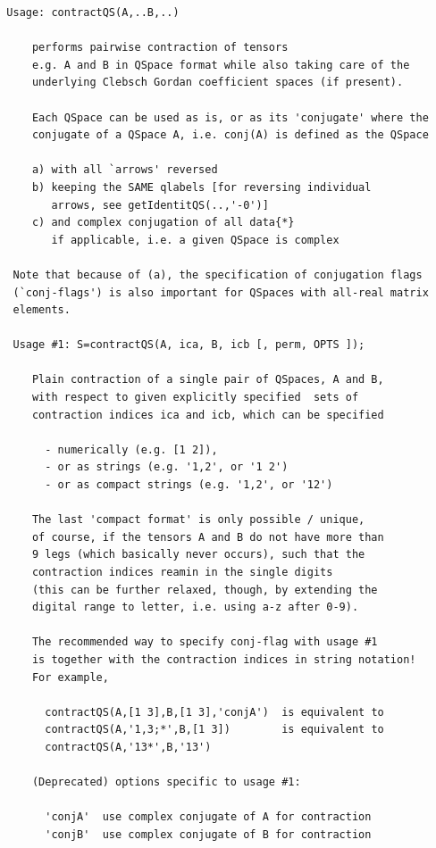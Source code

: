\documentclass[twoside,12pt]{article}
\begin{document}
\pagebreak[3]



\begin{verbatim}
  Usage: contractQS(A,..B,..)
 
      performs pairwise contraction of tensors
      e.g. A and B in QSpace format while also taking care of the
      underlying Clebsch Gordan coefficient spaces (if present).
 
      Each QSpace can be used as is, or as its 'conjugate' where the
      conjugate of a QSpace A, i.e. conj(A) is defined as the QSpace
 
      a) with all `arrows' reversed
      b) keeping the SAME qlabels [for reversing individual
         arrows, see getIdentitQS(..,'-0')]
      c) and complex conjugation of all data{*}
         if applicable, i.e. a given QSpace is complex
 
   Note that because of (a), the specification of conjugation flags
   (`conj-flags') is also important for QSpaces with all-real matrix
   elements.
 
   Usage #1: S=contractQS(A, ica, B, icb [, perm, OPTS ]);
 
      Plain contraction of a single pair of QSpaces, A and B,
      with respect to given explicitly specified  sets of
      contraction indices ica and icb, which can be specified
 
        - numerically (e.g. [1 2]),
        - or as strings (e.g. '1,2', or '1 2')
        - or as compact strings (e.g. '1,2', or '12')
 
      The last 'compact format' is only possible / unique,
      of course, if the tensors A and B do not have more than
      9 legs (which basically never occurs), such that the
      contraction indices reamin in the single digits
      (this can be further relaxed, though, by extending the
      digital range to letter, i.e. using a-z after 0-9).
 
      The recommended way to specify conj-flag with usage #1
      is together with the contraction indices in string notation!
      For example,
 
        contractQS(A,[1 3],B,[1 3],'conjA')  is equivalent to
        contractQS(A,'1,3;*',B,[1 3])        is equivalent to
        contractQS(A,'13*',B,'13')
 
      (Deprecated) options specific to usage #1:
 
        'conjA'  use complex conjugate of A for contraction
        'conjB'  use complex conjugate of B for contraction
 

\end{verbatim}
\end{document}
